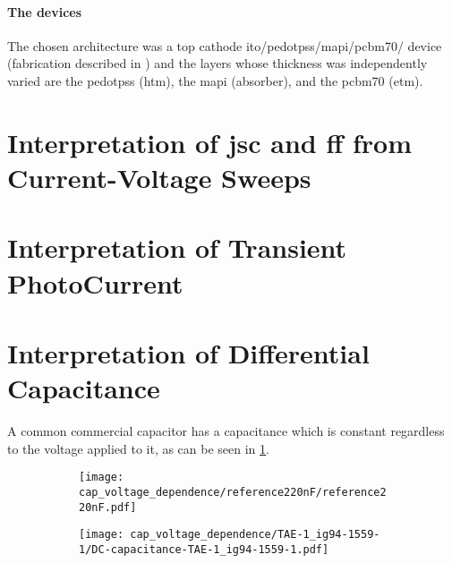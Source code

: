 \paragraph{The devices} The chosen architecture was a top cathode \gls{ito}/\gls{pedotpss}/\gls{mapi}/\gls{pcbm70}/ device (fabrication described in ) and the layers whose thickness was independently varied are the \gls{pedotpss} (\gls{htm}), the \gls{mapi} (absorber), and the \gls{pcbm70} (\gls{etm}).

\section{Interpretation of \gls{jsc} and \gls{ff} from Current-Voltage Sweeps}

\section{Interpretation of Transient PhotoCurrent}\label{interpretation_tpc}

\section{Interpretation of Differential Capacitance}\label{interpretation_dc}

A common commercial capacitor has a capacitance which is constant regardless to the voltage applied to it, as can be seen in \cref{fig:cap_voltage_dependence_commercial}.

\begin{figure}%
	\centering
	\begin{subfigure}[t]{0.45\textwidth}
		\texttt{[image: cap\_voltage\_dependence/reference220nF/reference220nF.pdf]}
		\label{fig:cap_voltage_dependence_commercial}
	\end{subfigure}
	\qquad
	\begin{subfigure}[t]{0.45\textwidth}
		\texttt{[image: cap\_voltage\_dependence/TAE-1\_ig94-1559-1/DC-capacitance-TAE-1\_ig94-1559-1.pdf]}
		\label{fig:cap_voltage_dependence_tae1}
	\end{subfigure}
	\label{fig:cap_voltage_dependence}
\end{figure}

